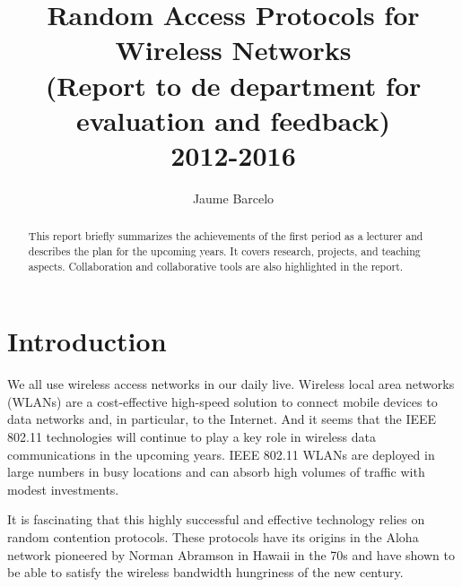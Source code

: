 \documentclass[a4paper,twocolumns]{article}%
\begin{document}
\title{Random Access Protocols for Wireless Networks\\ (Report to de department for evaluation and feedback) \\ 2012-2016 }

\author{Jaume Barcelo}


\date{}

\maketitle

\begin{abstract}
This report briefly summarizes the achievements of the first period as a lecturer and describes the plan for the upcoming years.
It covers research, projects, and teaching aspects.
Collaboration and collaborative tools are also highlighted in the report.



\end{abstract}

\tableofcontents

\clearpage


\section{Introduction}

We all use wireless access networks in our daily live.
Wireless local area networks (WLANs) are a cost-effective high-speed solution to connect mobile devices to data networks and, in particular, to the Internet.
And it seems that the IEEE 802.11 technologies will continue to play a key role in wireless data communications in the upcoming years.
IEEE 802.11 WLANs are deployed in large numbers in busy locations and can absorb high volumes of traffic with modest investments.

It is fascinating that this highly successful and effective technology relies on random contention protocols.
These protocols have its origins in the Aloha network pioneered by Norman Abramson in Hawaii in the 70s and have shown to be able to satisfy the wireless bandwidth hungriness of the new century.
\end{document}

